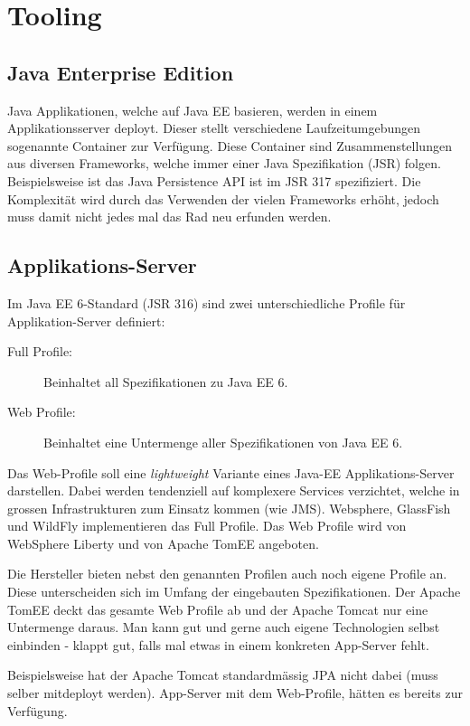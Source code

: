 \chapter{Tooling}

\section{Java Enterprise Edition}
Java Applikationen, welche auf Java EE basieren, werden in einem Applikationsserver deployt. Dieser stellt verschiedene Laufzeitumgebungen sogenannte Container zur Verfügung. Diese Container sind Zusammenstellungen aus diversen Frameworks, welche immer einer Java Spezifikation (JSR) folgen. Beispielsweise ist das Java Persistence API ist im JSR 317 spezifiziert. Die Komplexität wird durch das Verwenden der vielen Frameworks erhöht, jedoch muss damit nicht jedes mal das Rad neu erfunden werden.

\section{Applikations-Server}
Im Java EE 6-Standard (JSR 316) sind zwei unterschiedliche Profile für Applikation-Server definiert:

\begin{description}
	\item[Full Profile:] Beinhaltet all Spezifikationen zu Java EE 6.
	\item[Web Profile:] Beinhaltet eine Untermenge aller Spezifikationen von Java EE 6.
\end{description}

Das Web-Profile soll eine \emph{lightweight} Variante eines Java-EE Applikations-Server darstellen. Dabei werden tendenziell auf komplexere Services verzichtet, welche in grossen Infrastrukturen zum Einsatz kommen (wie JMS). Websphere, GlassFish und WildFly implementieren das Full Profile. Das Web Profile wird von WebSphere Liberty und von Apache TomEE angeboten.

Die Hersteller bieten nebst den genannten Profilen auch noch eigene Profile an. Diese unterscheiden sich im Umfang der eingebauten Spezifikationen. Der Apache TomEE deckt das gesamte Web Profile ab und der Apache Tomcat nur eine Untermenge daraus. Man kann gut und gerne auch eigene Technologien selbst einbinden - klappt gut, falls mal etwas in einem konkreten App-Server fehlt.

Beispielsweise hat der Apache Tomcat  standardmässig JPA nicht dabei (muss selber mitdeployt werden). App-Server mit dem Web-Profile, hätten es bereits zur Verfügung.

